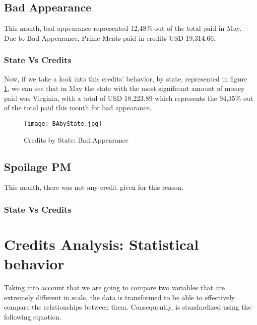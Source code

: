 \documentclass[12pt,a4paper, USA]{article}
\begin{document}

\subsection{Bad Appearance}

This month, bad appearance represented 12,48\% out of the total paid in May. Due to Bad Appearance, Prime Meats paid in credits USD 19,314.66.

\subsubsection{State Vs Credits}

Now, if we take a look into  this credits' behavior, by state, represented in figure \ref{fig: StateVsCreditsBA}, we can see that in May the state with the most significant amount of money paid was Virginia, with a total of USD 18,223.89 which represents the 94,35\% out of the total paid this month for bad appearance.

\begin{figure}[H]
    \centering
    \texttt{[image: BAbyState.jpg]}
    \caption{Credits by State: Bad Appearance}
    \label{fig: StateVsCreditsBA}
\end{figure}


\subsection{Spoilage PM}

This month, there was not any credit given for this reason.

\subsubsection{State Vs Credits}


\section{Credits Analysis: Statistical behavior }

Taking into account that we are going to compare two variables that are extremely different in scale, the data is transformed to be able to effectively compare the relationships between them. Consequently, is standardized using the following equation.
\end{document}
